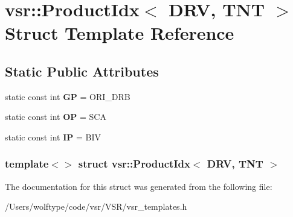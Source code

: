 \hypertarget{structvsr_1_1_product_idx_3_01_d_r_v_00_01_t_n_t_01_4}{\section{vsr\-:\-:Product\-Idx$<$ D\-R\-V, T\-N\-T $>$ Struct Template Reference}
\label{structvsr_1_1_product_idx_3_01_d_r_v_00_01_t_n_t_01_4}
}
\subsection*{Static Public Attributes}
\begin{DoxyCompactItemize}
\item 
\hypertarget{structvsr_1_1_product_idx_3_01_d_r_v_00_01_t_n_t_01_4_a1f64aee98e3fdbcfb00726a6dab05496}{static const int {\bfseries G\-P} = O\-R\-I\-\_\-\-D\-R\-B}\label{structvsr_1_1_product_idx_3_01_d_r_v_00_01_t_n_t_01_4_a1f64aee98e3fdbcfb00726a6dab05496}

\item 
\hypertarget{structvsr_1_1_product_idx_3_01_d_r_v_00_01_t_n_t_01_4_ad6ceb1fd358da9c220db3ce072cecc09}{static const int {\bfseries O\-P} = S\-C\-A}\label{structvsr_1_1_product_idx_3_01_d_r_v_00_01_t_n_t_01_4_ad6ceb1fd358da9c220db3ce072cecc09}

\item 
\hypertarget{structvsr_1_1_product_idx_3_01_d_r_v_00_01_t_n_t_01_4_a04fe28944da7c82f05aba12cedb78eaa}{static const int {\bfseries I\-P} = B\-I\-V}\label{structvsr_1_1_product_idx_3_01_d_r_v_00_01_t_n_t_01_4_a04fe28944da7c82f05aba12cedb78eaa}

\end{DoxyCompactItemize}
\subsubsection*{template$<$$>$ struct vsr\-::\-Product\-Idx$<$ D\-R\-V, T\-N\-T $>$}



The documentation for this struct was generated from the following file\-:\begin{DoxyCompactItemize}
\item 
/\-Users/wolftype/code/vsr/\-V\-S\-R/vsr\-\_\-templates.\-h\end{DoxyCompactItemize}

